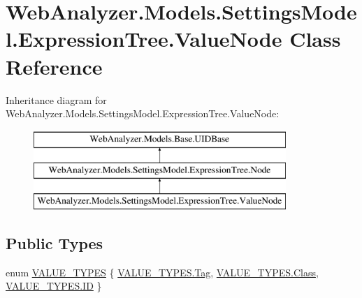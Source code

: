 \hypertarget{class_web_analyzer_1_1_models_1_1_settings_model_1_1_expression_tree_1_1_value_node}{}\section{Web\+Analyzer.\+Models.\+Settings\+Model.\+Expression\+Tree.\+Value\+Node Class Reference}
\label{class_web_analyzer_1_1_models_1_1_settings_model_1_1_expression_tree_1_1_value_node}
Inheritance diagram for Web\+Analyzer.\+Models.\+Settings\+Model.\+Expression\+Tree.\+Value\+Node\+:\begin{figure}[H]
\begin{center}
\leavevmode
\includegraphics[height=3.000000cm]{class_web_analyzer_1_1_models_1_1_settings_model_1_1_expression_tree_1_1_value_node}
\end{center}
\end{figure}
\subsection*{Public Types}
\begin{DoxyCompactItemize}
\item 
enum \hyperlink{class_web_analyzer_1_1_models_1_1_settings_model_1_1_expression_tree_1_1_value_node_ac18254d82bd6e0d754ed1a2484882d11}{V\+A\+L\+U\+E\+\_\+\+T\+Y\+P\+E\+S} \{ \hyperlink{class_web_analyzer_1_1_models_1_1_settings_model_1_1_expression_tree_1_1_value_node_ac18254d82bd6e0d754ed1a2484882d11ac101058e7ea21bbbf2a5ac893088e90b}{V\+A\+L\+U\+E\+\_\+\+T\+Y\+P\+E\+S.\+Tag}, 
\hyperlink{class_web_analyzer_1_1_models_1_1_settings_model_1_1_expression_tree_1_1_value_node_ac18254d82bd6e0d754ed1a2484882d11a9bd81329febf6efe22788e03ddeaf0af}{V\+A\+L\+U\+E\+\_\+\+T\+Y\+P\+E\+S.\+Class}, 
\hyperlink{class_web_analyzer_1_1_models_1_1_settings_model_1_1_expression_tree_1_1_value_node_ac18254d82bd6e0d754ed1a2484882d11ab718adec73e04ce3ec720dd11a06a308}{V\+A\+L\+U\+E\+\_\+\+T\+Y\+P\+E\+S.\+I\+D}
 \}
\end{DoxyCompactItemize}
